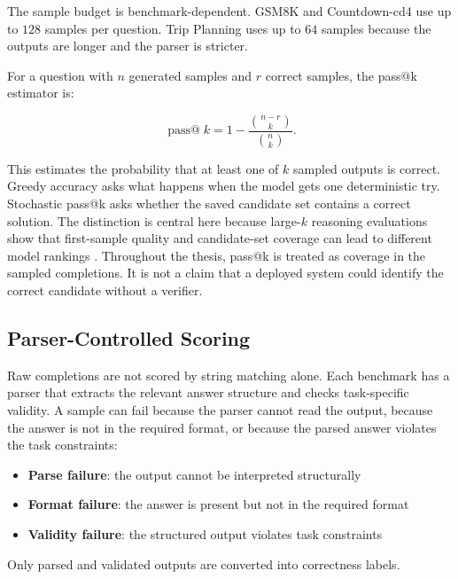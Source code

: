 The sample budget is benchmark-dependent. GSM8K and Countdown-cd4 use up to
$128$ samples per question. Trip Planning uses up to $64$ samples because the
outputs are longer and the parser is stricter.

For a question with $n$ generated samples and $r$ correct samples, the pass@k
estimator is:

\begin{equation}
    \operatorname{pass@}k = 1 - \frac{\binom{n-r}{k}}{\binom{n}{k}}.
\end{equation}

This estimates the probability that at least one of $k$ sampled outputs is
correct. Greedy accuracy asks what happens when the model gets one deterministic
try. Stochastic pass@k asks whether the saved candidate set contains a correct
solution. The distinction is central here because large-$k$ reasoning
evaluations show that first-sample quality and candidate-set coverage can lead
to different model rankings \cite{yue2025rlvr}. Throughout the thesis, pass@k
is treated as coverage in the sampled completions. It is not a claim that a
deployed system could identify the correct candidate without a verifier.

\subsection{Parser-Controlled Scoring}
\label{sec:parser-details}
\label{sec:methodology-parsers}

Raw completions are not scored by string matching alone. Each benchmark has a parser that extracts the relevant answer structure and checks task-specific validity. A sample can fail because the parser cannot read the output, because the answer is not in the required format, or because the parsed answer violates the task constraints:
\begin{itemize}
    \item \textbf{Parse failure}: the output cannot be interpreted structurally
    \item \textbf{Format failure}: the answer is present but not in the required format
    \item \textbf{Validity failure}: the structured output violates task constraints
\end{itemize}

Only parsed and validated outputs are converted into correctness labels.

